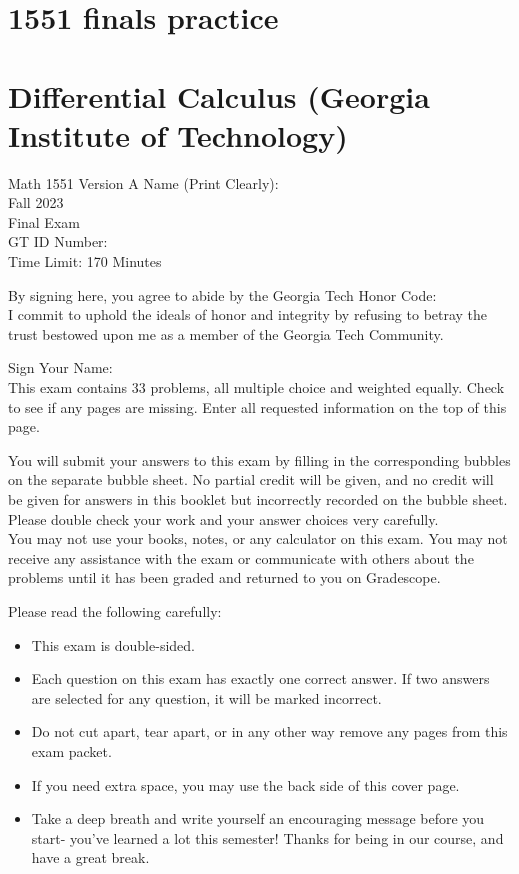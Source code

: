
\section*{1551 finals practice}
\section*{Differential Calculus (Georgia Institute of Technology)}
Math 1551 Version A Name (Print Clearly):\\
Fall 2023\\
Final Exam\\
GT ID Number:\\
Time Limit: 170 Minutes

By signing here, you agree to abide by the Georgia Tech Honor Code:\\
I commit to uphold the ideals of honor and integrity by refusing to betray the trust bestowed upon me as a member of the Georgia Tech Community.

Sign Your Name:\\
This exam contains 33 problems, all multiple choice and weighted equally. Check to see if any pages are missing. Enter all requested information on the top of this page.

You will submit your answers to this exam by filling in the corresponding bubbles on the separate bubble sheet. No partial credit will be given, and no credit will be given for answers in this booklet but incorrectly recorded on the bubble sheet.\\
Please double check your work and your answer choices very carefully.\\
You may not use your books, notes, or any calculator on this exam. You may not receive any assistance with the exam or communicate with others about the problems until it has been graded and returned to you on Gradescope.

Please read the following carefully:

\begin{itemize}
  \item This exam is double-sided.
  \item Each question on this exam has exactly one correct answer. If two answers are selected for any question, it will be marked incorrect.
  \item Do not cut apart, tear apart, or in any other way remove any pages from this exam packet.
  \item If you need extra space, you may use the back side of this cover page.
  \item Take a deep breath and write yourself an encouraging message before you start- you've learned a lot this semester! Thanks for being in our course, and have a great break.
\end{itemize}

